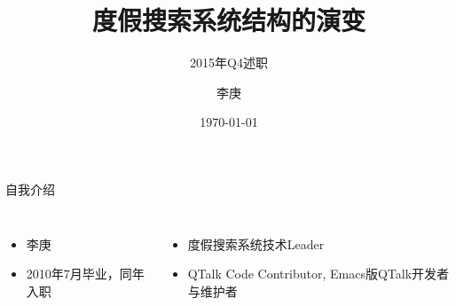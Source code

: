 \documentclass{beamer}
\begin{document}
\begin{CJK}{UTF8}{gbsn}

\title{度假搜索系统结构的演变}

\subtitle{2015年Q4述职}

\author{李庚}


\date{\today}


\begin{frame}
  \titlepage
\end{frame}

\begin{frame}{自我介绍}
  \begin{columns}
    \begin{itemize}
      \item { 李庚 }
      \item { 2010年7月毕业，同年入职 }
    \end{itemize}
    \begin{itemize}[1]
      \item<2-> 度假搜索系统技术Leader
      \item<2-> QTalk Code Contributor, Emacs版QTalk开发者与维护者
    \end{itemize}
  \end{columns}  
\end{frame}


\end{CJK}
\end{document}

